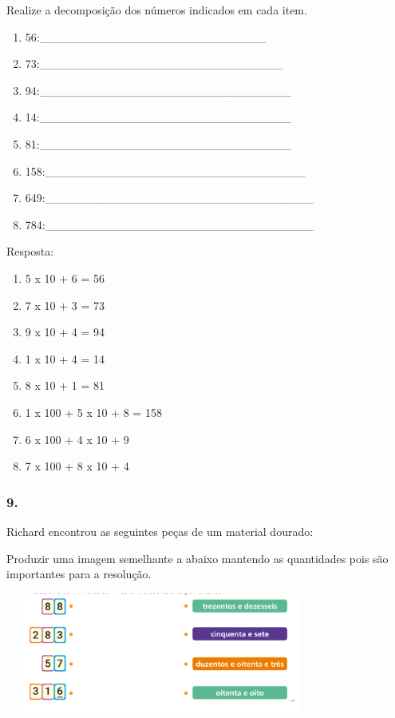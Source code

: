 Realize a decomposição dos números indicados em cada item.

\begin{enumerate}
\def\labelenumi{\alph{enumi})}
\item
  56:\_\_\_\_\_\_\_\_\_\_\_\_\_\_\_\_\_\_\_\_\_\_\_\_\_\_\_
\item
  73:\_\_\_\_\_\_\_\_\_\_\_\_\_\_\_\_\_\_\_\_\_\_\_\_\_\_\_\_\_
\item
  94:\_\_\_\_\_\_\_\_\_\_\_\_\_\_\_\_\_\_\_\_\_\_\_\_\_\_\_\_\_\_
\item
  14:\_\_\_\_\_\_\_\_\_\_\_\_\_\_\_\_\_\_\_\_\_\_\_\_\_\_\_\_\_\_
\item
  81:\_\_\_\_\_\_\_\_\_\_\_\_\_\_\_\_\_\_\_\_\_\_\_\_\_\_\_\_\_\_
\item
  158:\_\_\_\_\_\_\_\_\_\_\_\_\_\_\_\_\_\_\_\_\_\_\_\_\_\_\_\_\_\_\_
\item
  649:\_\_\_\_\_\_\_\_\_\_\_\_\_\_\_\_\_\_\_\_\_\_\_\_\_\_\_\_\_\_\_\_
\item
  784:\_\_\_\_\_\_\_\_\_\_\_\_\_\_\_\_\_\_\_\_\_\_\_\_\_\_\_\_\_\_\_\_
\end{enumerate}

Resposta:

\begin{enumerate}
\def\labelenumi{\alph{enumi})}
\item
  5 x 10 + 6 = 56
\item
  7 x 10 + 3 = 73
\item
  9 x 10 + 4 = 94
\item
  1 x 10 + 4 = 14
\item
  8 x 10 + 1 = 81
\item
  1 x 100 + 5 x 10 + 8 = 158
\item
  6 x 100 + 4 x 10 + 9
\item
  7 x 100 + 8 x 10 + 4
\end{enumerate}

\subsubsection{9.}\label{section-8}

Richard encontrou as seguintes peças de um material dourado:

Produzir uma imagem semelhante a abaixo mantendo as quantidades pois são
importantes para a resolução.

\includegraphics[width=4.02535in,height=1.55013in]{media/image5.png}


